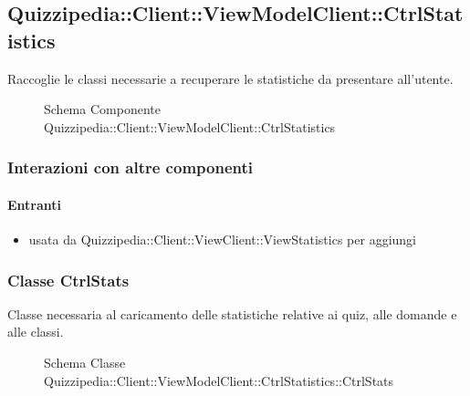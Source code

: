 \subsection{Quizzipedia::Client::ViewModelClient::CtrlStatistics}
Raccoglie le classi necessarie a recuperare le statistiche da presentare all'utente.
\begin{figure}[H]
\centering
\noindent{}
\caption[Schema Componente Quizzipedia::Client::ViewModelClient::CtrlStatistics]{Schema Componente Quizzipedia::Client::ViewModelClient::CtrlStatistics}
\end{figure}
\subsubsection{Interazioni con altre componenti}
\paragraph{Entranti}
\begin{itemize}
\item usata da Quizzipedia::Client::ViewClient::ViewStatistics per aggiungi
\end{itemize}
\subsubsection{Classe CtrlStats}
Classe necessaria al caricamento delle statistiche relative ai quiz, alle domande e alle classi.
\begin{figure}[H]
\centering
\noindent{}
\caption[Schema Classe CtrlStats]{Schema Classe Quizzipedia::Client::ViewModelClient::CtrlStatistics::CtrlStats}
\end{figure}
